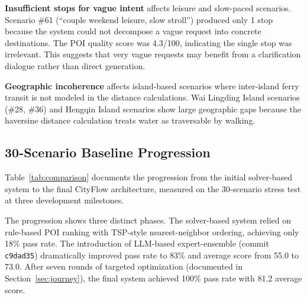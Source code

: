 \textbf{Insufficient stops for vague intent} affects leisure and slow-paced scenarios. Scenario \#61 (``couple weekend leisure, slow stroll'') produced only 1 stop because the system could not decompose a vague request into concrete destinations. The POI quality score was 4.3/100, indicating the single stop was irrelevant. This suggests that very vague requests may benefit from a clarification dialogue rather than direct generation.

\textbf{Geographic incoherence} affects island-based scenarios where inter-island ferry transit is not modeled in the distance calculations. Wai Lingding Island scenarios (\#28, \#36) and Hengqin Island scenarios show large geographic gaps because the haversine distance calculation treats water as traversable by walking.

\subsection{30-Scenario Baseline Progression}

Table~\ref{tab:comparison} documents the progression from the initial solver-based system to the final CityFlow architecture, measured on the 30-scenario stress test at three development milestones.

\begin{table}[!t]
\centering
\caption{System progression on 30 scenarios across three development milestones. Scores are rule-based composite (0--100 scale).}
\label{tab:comparison}
\end{table}

The progression shows three distinct phases. The solver-based system relied on rule-based POI ranking with TSP-style nearest-neighbor ordering, achieving only 18\% pass rate. The introduction of LLM-based expert-ensemble (commit \texttt{c9dad35}) dramatically improved pass rate to 83\% and average score from 55.0 to 73.0. After seven rounds of targeted optimization (documented in Section~\ref{sec:journey}), the final system achieved 100\% pass rate with 81.2 average score.

